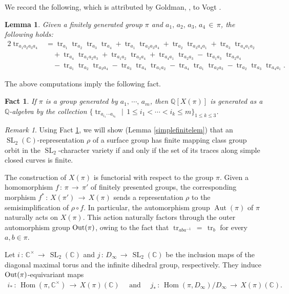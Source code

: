 \documentclass[reqno]{amsart}
\theoremstyle{plain}
\newtheorem{lemma}[theorem]{Lemma}
\newtheorem{fact}[theorem]{Fact}
\theoremstyle{definition}
\theoremstyle{remark}
\newtheorem*{remark}{Remark}
\newcommand{\C}{{\mathbb{C}}}
\newcommand{\Q}{{\mathbb{Q}}}
\DeclareMathOperator{\Aut}{Aut}
\DeclareMathOperator{\Hom}{Hom}
\DeclareMathOperator{\Out}{\textup{Out}}
\DeclareMathOperator{\SL}{SL}
\DeclareMathOperator{\tr}{tr}
\begin{document}
We record the following, which is attributed by Goldman, \cite{goldman2}, to Vogt \cite{vogt}.

\begin{lemma}
\label{rellem}
Given a finitely generated group $\pi$ and $a_1,\,a_2,\,a_3,\,a_4\,\in\, \pi$, the following holds:
\begin{align*}
2{\tr_{a_1a_2a_3a_4}}&={\tr_{a_1}}{\tr_{a_2}}{\tr_{a_3}}{\tr_{a_4}}+{\tr_{a_1}}{\tr_{a_2a_3a_4}}+{\tr_{a_2}}{\tr_{a_3a_4a_1}}+{\tr_{a_3}}{\tr_{a_4a_1a_2}}\\
&\quad +{\tr_{a_4}}{\tr_{a_1a_2a_3}}+{\tr_{a_1a_2}}{\tr_{a_3a_4}}+{\tr_{a_4a_1}}{\tr_{a_2a_3}}-{\tr_{a_1a_3}}{\tr_{a_2a_4}}\\
&\quad -{\tr_{a_1}}{\tr_{a_2}}{\tr_{a_3a_4}}-{\tr_{a_3}}{\tr_{a_4}}{\tr_{a_1a_2}}-{\tr_{a_4}}{\tr_{a_1}}{\tr_{a_2a_3}}-{\tr_{a_2}}{\tr_{a_3}}{\tr_{a_4a_1}}.
\end{align*}
\end{lemma}

The above computations imply the following fact.

\begin{fact}
\label{fact}
If $\pi$ is a group generated by $a_1,\,\cdots,\,a_m$, then $\Q[X(\pi)]$ is generated as a $\Q$-algebra by the collection $\{\tr_{a_{i_1}\cdots a_{i_k}}\,\mid\,1\leq i_1<\cdots<i_k\leq m\}_{1\leq k\leq 3}$.
\end{fact}

\begin{remark}
Using Fact \ref{fact}, we will show (Lemma \ref{simplefinitelem}) that an $\SL_2(\C)$-representation $\rho$ of a surface group has finite mapping class group orbit in the $\SL_2$-character variety if and only if the set of its traces along simple closed curves is finite.
\end{remark}

The construction of $X(\pi)$ is functorial with respect to the group
$\pi$. Given a homomorphism $f\,:\,\pi\,\to\,\pi'$ of finitely presented groups, the corresponding
morphism $f^*\,:\,X(\pi')\,\to\, X(\pi)$ sends a representation $\rho$ to the semisimplification of
$\rho\circ f$. In particular, the automorphism group $\Aut(\pi)$ of $\pi$ naturally acts
on $X(\pi)$. This action naturally factors through the outer automorphism group $\Out(\pi)$,
owing to the fact that $\tr_{aba^{-1}}\,=\,\tr_{b}$ for every $a,b\in\pi$.

Let $i\,:\,\C^\times\,\to\,\SL_2(\C)$ and $j\,:\,D_\infty\,\to\,\SL_2(\C)$ be the inclusion maps of the diagonal
maximal torus and the infinite dihedral group, respectively. They induce $\Out(\pi)$-equivariant maps
\begin{align*}
\tag{$*$}
i_*\,:\,\Hom(\pi,\C^\times)\,\to\, X(\pi)(\C)\quad\text{ and }\quad j_*\,:\,\Hom(\pi,D_\infty)/D_\infty\,\to\, X(\pi)(\C).
\end{align*}
\end{document}
